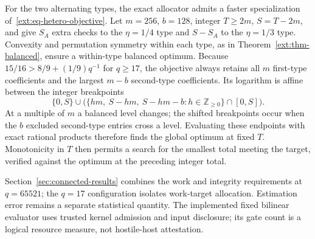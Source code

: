 For the two alternating types, the exact allocator admits a faster
specialization of~\eqref{ext:eq-hetero-objective}. Let $m=256$, $b=128$,
integer $T\ge2m$, $S=T-2m$, and give $S_A$ extra checks to
the $\eta=1/4$ type and $S-S_A$ to the $\eta=1/3$ type.
Convexity and permutation symmetry within each type, as in
Theorem~\ref{ext:thm-balanced}, ensure a within-type balanced optimum.
Because $15/16>8/9+(1/9)q^{-1}$ for $q\ge17$, the objective always
retains all $m$ first-type coefficients and the largest $m-b$ second-type
coefficients. Its logarithm is affine between the integer breakpoints
\[
 \{0,S\}\cup\bigl(\{hm,\ S-hm,\ S-hm-b:h\in\mathbb Z_{\ge0}\}\cap[0,S]\bigr).
\]
At a multiple of $m$ a balanced level changes; the shifted breakpoints
occur when the $b$ excluded second-type entries cross a level.
Evaluating these endpoints with exact rational products therefore finds
the global optimum at fixed $T$. Monotonicity in $T$ then permits a
search for the smallest total meeting the target, verified against the
optimum at the preceding integer total.

Section~\ref{sec:connected-results} combines the work and integrity
requirements at $q=65521$; the $q=17$ configuration isolates work-target
allocation. Estimation error remains a separate statistical quantity. The implemented fixed bilinear evaluator uses trusted
kernel admission and input disclosure; its gate count is a logical
resource measure, not hostile-host attestation.
